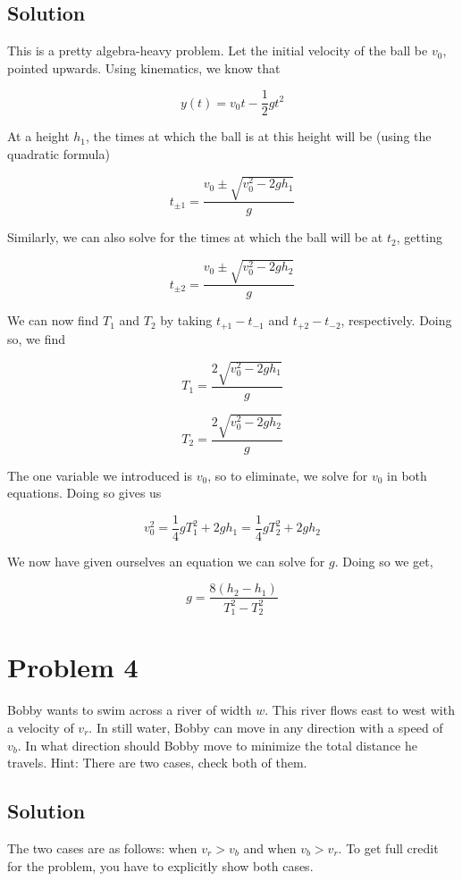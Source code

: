 \documentclass[11pt]{scrartcl}
\begin{document}
\subsection*{Solution}
This is a pretty algebra-heavy problem.
Let the initial velocity of the ball be $v_0$, pointed upwards.
Using kinematics, we know that

$$
y(t) = v_0 t - \frac{1}{2} gt^2
$$

At a height $h_1$, the times at which the ball is at this height will be (using the quadratic formula)

$$
t_{\pm 1} = \frac{v_0 \pm \sqrt{v_0^2 - 2gh_1}}{g}
$$

Similarly, we can also solve for the times at which the ball will be at $t_2$, getting

$$
t_{\pm 2} = \frac{v_0 \pm \sqrt{v_0^2 - 2gh_2}}{g}
$$

We can now find $T_1$ and $T_2$ by taking $t_{+1} - t_{-1}$ and $t_{+2} - t_{-2}$, respectively.
Doing so, we find

$$
T_1 = \frac{2 \sqrt{v_0^2 - 2gh_1}}{g}
$$

$$
T_2 = \frac{2 \sqrt{v_0^2 - 2gh_2}}{g}
$$

The one variable we introduced is $v_0$, so to eliminate, we solve for $v_0$ in both equations.
Doing so gives us

$$
v_0^2 = \frac{1}{4} gT_1^2 + 2gh_1 = \frac{1}{4} gT_2^2 + 2gh_2
$$

We now have given ourselves an equation we can solve for $g$.
Doing so we get,

$$g = \boxed{\frac{8(h_2 - h_1)}{T_1^2 - T_2^2}}$$

\newpage

\section{Problem 4}
Bobby wants to swim across a river of width $w$.
This river flows east to west with a velocity of $v_r$.
In still water, Bobby can move in any direction with a speed of $v_b$.
In what direction should Bobby move to minimize the total distance he travels.
Hint: There are two cases, check both of them.

\subsection{Solution}
The two cases are as follows: when $v_r > v_b$ and when $v_b > v_r$.
To get full credit for the problem, you have to explicitly show both cases.
\end{document}
